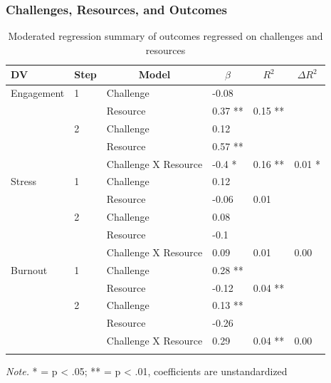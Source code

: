\documentclass[
  man]{apa7}
\begin{document}
\hypertarget{challenges-resources-and-outcomes}{%
\subsubsection{Challenges, Resources, and Outcomes}\label{challenges-resources-and-outcomes}}

\begin{table}[tbp]

\begin{center}
\begin{threeparttable}

\caption{\label{tab:chal-resource-table}Moderated regression summary of outcomes regressed on challenges and resources}

\begin{tabular}{llllll}
\toprule
DV & \multicolumn{1}{c}{Step} & \multicolumn{1}{c}{Model} & \multicolumn{1}{c}{$\beta$} & \multicolumn{1}{c}{$R^2$} & \multicolumn{1}{c}{$\Delta R^2$}\\
\midrule
Engagement & 1 & Challenge & -0.08 &  & \\
 &  & Resource & 0.37 ** & 0.15 ** & \\
 & 2 & Challenge & 0.12 &  & \\
 &  & Resource & 0.57 ** &  & \\
 &  & Challenge X Resource & -0.4 * & 0.16 ** & 0.01 *\\
Stress & 1 & Challenge & 0.12 &  & \\
 &  & Resource & -0.06 & 0.01 & \\
 & 2 & Challenge & 0.08 &  & \\
 &  & Resource & -0.1 &  & \\
 &  & Challenge X Resource & 0.09 & 0.01 & 0.00\\
Burnout & 1 & Challenge & 0.28 ** &  & \\
 &  & Resource & -0.12 & 0.04 ** & \\
 & 2 & Challenge & 0.13 ** &  & \\
 &  & Resource & -0.26 &  & \\
 &  & Challenge X Resource & 0.29 & 0.04 ** & 0.00\\
\bottomrule
\addlinespace
\end{tabular}

\begin{tablenotes}[para]
\normalsize{\textit{Note.} * = p < .05; ** = p < .01, coefficients are unstandardized}
\end{tablenotes}

\end{threeparttable}
\end{center}

\end{table}
\end{document}
